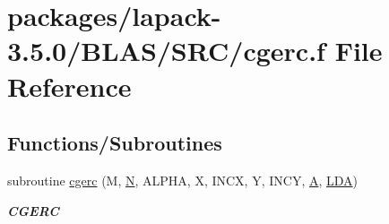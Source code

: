 \hypertarget{lapack-3_85_80_2BLAS_2SRC_2cgerc_8f}{}\section{packages/lapack-\/3.5.0/\+B\+L\+A\+S/\+S\+R\+C/cgerc.f File Reference}
\label{lapack-3_85_80_2BLAS_2SRC_2cgerc_8f}
\subsection*{Functions/\+Subroutines}
\begin{DoxyCompactItemize}
\item 
subroutine \hyperlink{group__complex__blas__level2_ga35e2f0f20e014b9f0ec090a6eb3def22}{cgerc} (M, \hyperlink{polmisc_8c_a0240ac851181b84ac374872dc5434ee4}{N}, A\+L\+P\+H\+A, X, I\+N\+C\+X, Y, I\+N\+C\+Y, \hyperlink{classA}{A}, \hyperlink{example__user_8c_ae946da542ce0db94dced19b2ecefd1aa}{L\+D\+A})
\begin{DoxyCompactList}\small\item\em {\bfseries C\+G\+E\+R\+C} \end{DoxyCompactList}\end{DoxyCompactItemize}

